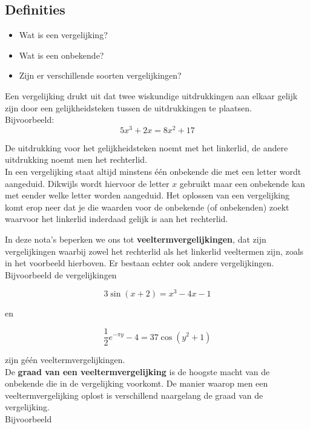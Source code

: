 \newpage

\subsection{Definities}

\begin{itemize}
	\item Wat is een vergelijking?
    \item Wat is een onbekende?
    \item Zijn er verschillende soorten vergelijkingen?
	
\end{itemize}

Een vergelijking drukt uit dat twee wiskundige uitdrukkingen aan elkaar gelijk zijn door een gelijkheidsteken tussen de uitdrukkingen te plaatsen.\\ Bijvoorbeeld:\\

\[5x^3 + 2x = 8x^2 + 17\]

De uitdrukking voor het gelijkheidsteken noemt met het linkerlid, de andere uitdrukking noemt men het rechterlid.\\

In een vergelijking staat altijd minstens \'{e}\'{e}n onbekende die met een letter wordt aangeduid. Dikwijls wordt hiervoor de letter $x$ gebruikt maar een onbekende kan met eender welke letter worden aangeduid. Het oplossen van een vergelijking komt erop neer dat je die waarden voor de onbekende (of onbekenden) zoekt waarvoor het linkerlid inderdaad gelijk is aan het rechterlid.

In deze nota's beperken we ons tot {\bf veeltermvergelijkingen}, dat zijn vergelijkingen waarbij zowel het rechterlid als het linkerlid veeltermen zijn, zoals in het voorbeeld hierboven. Er bestaan echter ook andere vergelijkingen. Bijvoorbeeld de vergelijkingen

\[ 3\sin(x+2)=x^3 - 4x -1 \]

en

\[ \frac{1}{2} e^{-\pi y} - 4 = 37 \cos(y^2 +1) \]

zijn g\'{e}\'{e}n veeltermvergelijkingen.\\

De {\bf graad van een veeltermvergelijking} is de hoogste macht van de onbekende die in de vergelijking voorkomt. De manier waarop men een veeltermvergelijking oplost is verschillend naargelang de graad van de vergelijking.\\
Bijvoorbeeld

